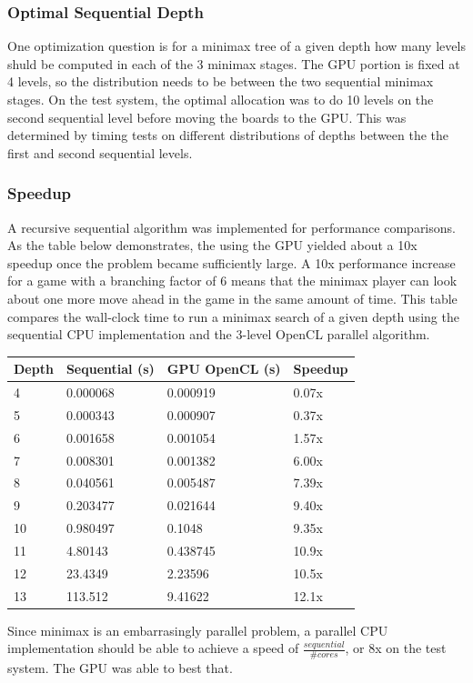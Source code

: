 \documentclass{article}
\begin{document}
\subsubsection{Optimal Sequential Depth}
One optimization question is for a minimax tree of a given depth how many levels shuld be computed in each of the 3 minimax stages. The GPU portion is fixed at 4 levels, so the distribution needs to be between the two sequential minimax stages. On the test system, the optimal allocation was to do 10 levels on the second sequential level before moving the boards to the GPU. This was determined by timing tests on different distributions of depths between the the first and second sequential levels.

\subsubsection{Speedup}
A recursive sequential algorithm was implemented for performance comparisons. As the table below demonstrates, the using the GPU yielded about a 10x speedup once the problem became sufficiently large. A 10x performance increase for a game with a branching factor of 6 means that the minimax player can look about one more move ahead in the game in the same amount of time. This table compares the wall-clock time to run a minimax search of a given depth using the sequential CPU implementation and the 3-level OpenCL parallel algorithm.

\begin{tabular}{| l | l | l | l |}
  \hline
  Depth & Sequential (s) & GPU OpenCL (s) & Speedup\\
  \hline
  4 & 0.000068 & 0.000919 & 0.07x \\
  5 & 0.000343 & 0.000907 & 0.37x \\
  6 & 0.001658 & 0.001054 & 1.57x \\
  7 & 0.008301 & 0.001382 & 6.00x \\
  8 & 0.040561 & 0.005487 & 7.39x \\
  9 & 0.203477 & 0.021644 & 9.40x \\
  10 & 0.980497 & 0.1048 & 9.35x \\
  11 & 4.80143 & 0.438745 & 10.9x \\
  12 & 23.4349 & 2.23596 & 10.5x \\
  13 & 113.512 & 9.41622 & 12.1x \\
  \hline
\end{tabular}

Since minimax is an embarrasingly parallel problem, a parallel CPU implementation should be able to achieve a speed of $\frac{sequential}{\# cores}$, or 8x on the test system. The GPU was able to best that.
\end{document}
